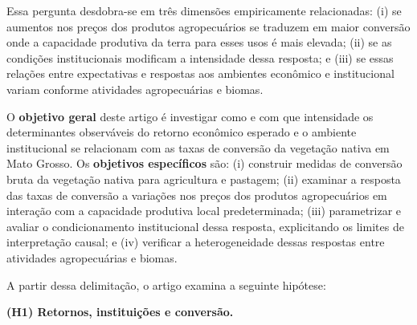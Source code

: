 \medskip

Essa pergunta desdobra-se em três dimensões empiricamente relacionadas: (i) se aumentos nos preços dos produtos agropecuários se traduzem em maior conversão onde a capacidade produtiva da terra para esses usos é mais elevada; (ii) se as condições institucionais modificam a intensidade dessa resposta; e (iii) se essas relações entre expectativas e respostas aos ambientes econômico e institucional variam conforme atividades agropecuárias e biomas. 

O \textbf{objetivo geral} deste artigo é investigar como e com que intensidade os determinantes observáveis do retorno econômico esperado e o ambiente institucional se relacionam com as taxas de conversão da vegetação nativa em Mato Grosso. Os \textbf{objetivos específicos} são: (i) construir medidas de conversão bruta da vegetação nativa para agricultura e pastagem; (ii) examinar a resposta das taxas de conversão a variações nos preços dos produtos agropecuários em interação com a capacidade produtiva local predeterminada; (iii) parametrizar e avaliar o condicionamento institucional dessa resposta, explicitando os limites de interpretação causal; e (iv) verificar a heterogeneidade dessas respostas entre atividades agropecuárias e biomas.



A partir dessa delimitação, o artigo examina a seguinte hipótese:

\medskip

\noindent\textbf{(H1) Retornos, instituições e conversão.}

